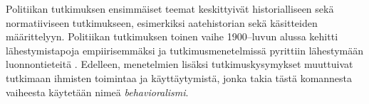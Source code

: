 \documentclass[finnish,gradu,twoside,12pt]{tktltiki}
\begin{document}



Politiikan tutkimuksen ensimmäiset teemat keskittyivät historialliseen sekä normatiiviseen tutkimukseen, esimerkiksi aatehistorian sekä käsitteiden määrittelyyn. Politiikan tutkimuksen toinen vaihe 1900--luvun alussa kehitti lähestymistapoja empiirisemmäksi ja tutkimusmenetelmissä pyrittiin lähestymään luonnontieteitä \citep{historia}. Edelleen, menetelmien lisäksi tutkimuskysymykset muuttuivat tutkimaan ihmisten toimintaa ja käyttäytymistä, jonka takia tästä komannesta vaiheesta käytetään nimeä \textit{behavioralismi}.
\end{document}
